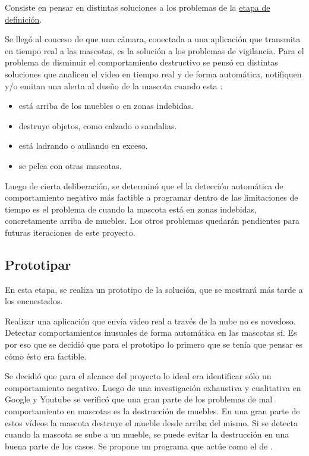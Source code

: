 Consiste en pensar en distintas soluciones a los problemas de la \hyperref[sec:definir]{etapa de definición}.

Se llegó al conceso de que una cámara, conectada a una aplicación que transmita en tiempo real a las mascotas, es la solución a los problemas de vigilancia. Para el problema de disminuir el comportamiento destructivo se pensó en distintas soluciones que analicen el video en tiempo real y de forma automática, notifiquen y/o emitan una alerta al dueño de la mascota cuando esta :

\begin{itemize}
  \item está arriba de los muebles o en zonas indebidas.
  \item destruye objetos, como calzado o sandalias.
  \item está ladrando o aullando en exceso.
  \item se pelea con otras mascotas.
\end{itemize}

Luego de cierta deliberación, se determinó que el la detección automática de  comportamiento negativo más factible a programar dentro de las limitaciones de tiempo es el problema de cuando la mascota está en zonas indebidas, concretamente arriba de muebles. Los otros problemas quedarán pendientes para futuras iteraciones de este proyecto.

\subsection{Prototipar}

En esta etapa, se realiza un prototipo de la solución, que se mostrará más tarde a los encuestados.


Realizar una aplicación que envía video real a través de la nube no es novedoso. Detectar comportamientos inusuales de forma automática en las mascotas sí. Es por eso que se decidió que para el prototipo lo primero que se tenía que pensar es cómo ésto era factible. 

Se decidió que para el alcance del proyecto lo ideal era identificar sólo un comportamiento negativo. Luego de una investigación exhaustiva y cualitativa en Google y Youtube se verificó que una gran parte de los problemas de mal comportamiento en mascotas es la destrucción de muebles. En  una gran parte de estos vídeos la mascota destruye el mueble desde arriba del mismo. Si se detecta cuando la mascota se sube a un mueble, se puede evitar la destrucción en una buena parte de los casos. Se propone un programa que actúe como el de .



